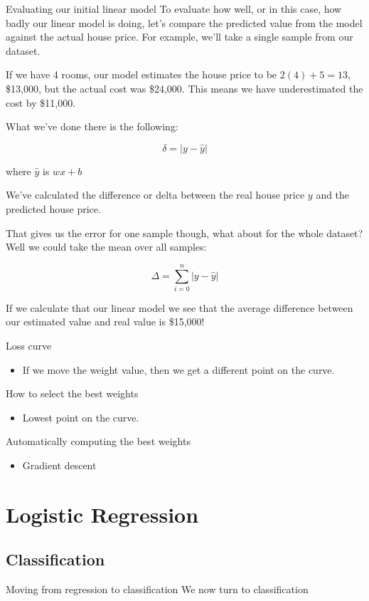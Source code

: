 \documentclass[10pt]{beamer}
\begin{document}
\begin{frame}[fragile,allowframebreaks,label=]{Evaluating our initial linear model}
To evaluate how well, or in this case, how badly our linear model is doing, let's
compare the predicted value from the model against the actual house price. For
example, we'll take a single sample from our dataset.

If we have 4 rooms, our model estimates the house price to be \(2(4) + 5 = 13\),
\$13,000, but the actual cost was \$24,000. This means we have underestimated the cost
by \$11,000.

What we've done there is the following:

\[
\delta = | y - \hat{y} |
\]

where \(\hat{y}\) is \(w x + b\)

We've calculated the difference or delta between the real house price \(y\) and the
predicted house price.

That gives us the error for one sample though, what about for the whole dataset? Well
we could take the mean over all samples:

\[
\Delta = \sum_{i=0}^n | y - \hat{y} |
\]

If we calculate that our linear model we see that the average difference between our
estimated value and real value is \$15,000!
\end{frame}

\begin{frame}[label={sec:orgfb90a7b}]{Loss curve}
\begin{itemize}
\item If we move the weight value, then we get a different point on the curve.
\end{itemize}
\end{frame}

\begin{frame}[label={sec:org6e55ae5}]{How to select the best weights}
\begin{itemize}
\item Lowest point on the curve.
\end{itemize}
\end{frame}

\begin{frame}[label={sec:org1985c21}]{Automatically computing the best weights}
\begin{itemize}
\item Gradient descent
\end{itemize}
\end{frame}

\section*{Logistic Regression}
\label{sec:org2c6d337}

\subsection*{Classification}
\label{sec:org0fa8076}

\begin{frame}[label={sec:org9676b11}]{Moving from regression to classification}
We now turn to classification
\end{frame}
\end{document}
